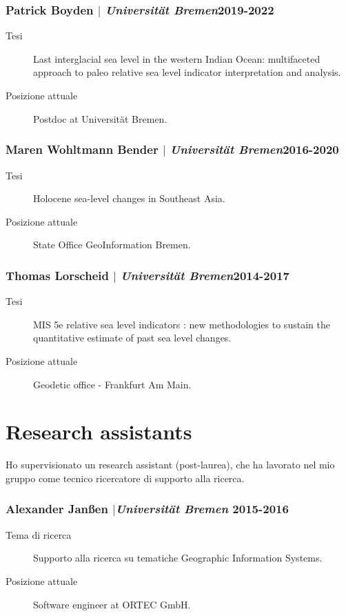 \documentclass[11pt]{article}
\begin{document}
\subsubsection{Patrick Boyden $|$ {\normalfont\textit{Universität Bremen}}\hfill 2019-2022}
{\footnotesize 
\begin{description}
  \item [Tesi] Last interglacial sea level in the western Indian Ocean: multifaceted approach to paleo relative sea level indicator interpretation and analysis.
  \item [Posizione attuale] Postdoc at Universität Bremen. 
\end{description}
}
\smallskip

\subsubsection{Maren Wohltmann Bender $|$ {\normalfont\textit{Universität Bremen}}\hfill 2016-2020}
{\footnotesize 
\begin{description}
  \item [Tesi] Holocene sea-level changes in Southeast Asia.
  \item [Posizione attuale] State Office GeoInformation Bremen. 
\end{description}
}
\smallskip

\subsubsection{Thomas Lorscheid $|$ {\normalfont\textit{Universität Bremen}}\hfill 2014-2017}
{\footnotesize 
\begin{description}
  \item [Tesi] MIS 5e relative sea level indicators : new methodologies to sustain the quantitative estimate of past sea level changes.
  \item [Posizione attuale] Geodetic office - Frankfurt Am Main. 
\end{description}
}

\section{Research assistants}
{\normalfont Ho supervisionato un research assistant (post-laurea), che ha lavorato nel mio gruppo come tecnico ricercatore di supporto alla ricerca.}\\

\subsubsection{Alexander Janßen $|${\normalfont\textit{Universität Bremen}} \hfill 2015-2016}
{\footnotesize 
\begin{description}
  \item [Tema di ricerca] Supporto alla ricerca su tematiche Geographic Information Systems. 
  \item [Posizione attuale] Software engineer at ORTEC GmbH.

\end{description}
}
\end{document}
